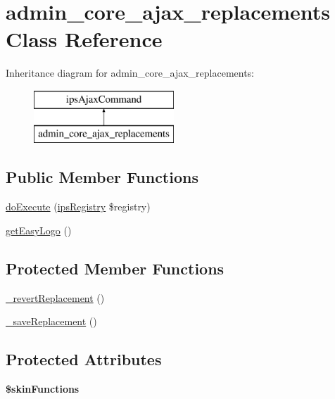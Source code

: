 \hypertarget{classadmin__core__ajax__replacements}{\section{admin\-\_\-core\-\_\-ajax\-\_\-replacements Class Reference}
\label{classadmin__core__ajax__replacements}
}
Inheritance diagram for admin\-\_\-core\-\_\-ajax\-\_\-replacements\-:\begin{figure}[H]
\begin{center}
\leavevmode
\includegraphics[height=2.000000cm]{classadmin__core__ajax__replacements}
\end{center}
\end{figure}
\subsection*{Public Member Functions}
\begin{DoxyCompactItemize}
\item 
\hyperlink{classadmin__core__ajax__replacements_afbc4e912a0604b94d47d66744c64d8ba}{do\-Execute} (\hyperlink{classips_registry}{ips\-Registry} \$registry)
\item 
\hyperlink{classadmin__core__ajax__replacements_acb58217777dd6523d0b69b85fa2582cb}{get\-Easy\-Logo} ()
\end{DoxyCompactItemize}
\subsection*{Protected Member Functions}
\begin{DoxyCompactItemize}
\item 
\hyperlink{classadmin__core__ajax__replacements_a968ef680b1ed3ad168c7854c44b26667}{\-\_\-revert\-Replacement} ()
\item 
\hyperlink{classadmin__core__ajax__replacements_a1a3353589a3267ef7901454429f090ce}{\-\_\-save\-Replacement} ()
\end{DoxyCompactItemize}
\subsection*{Protected Attributes}
\begin{DoxyCompactItemize}
\item 
\hypertarget{classadmin__core__ajax__replacements_a41d90687021c6f16184b43666509dee8}{{\bfseries \$skin\-Functions}}\label{classadmin__core__ajax__replacements_a41d90687021c6f16184b43666509dee8}

\end{DoxyCompactItemize}



